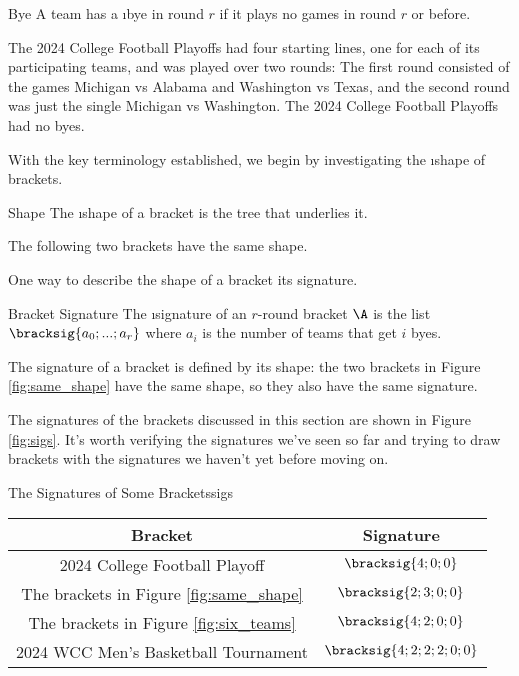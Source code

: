 {\begin{definition}{Bye}{}
    A team has a \i{bye} in round $r$ if it plays no games in round $r$ or before.
\end{definition}

The 2024 College Football Playoffs had four starting lines, one for each of its participating teams, and was played over two rounds: The first round consisted of the games Michigan vs Alabama and Washington vs Texas, and the second round was just the single  Michigan vs Washington. The 2024 College Football Playoffs had no byes.

With the key terminology established, we begin by investigating the \i{shape} of brackets.

\begin{definition}{Shape}{}
    The \i{shape} of a bracket is the tree that underlies it.
\end{definition}

The following two brackets have the same shape.


One way to describe the shape of a bracket its signature.

\begin{definition}{Bracket Signature}{}
    The \i{signature} of an $r$-round bracket $\A$ is the list $\bracksig{a_0; ...; a_r}$ where $a_i$ is the number of teams that get $i$ byes.
\end{definition}

The signature of a bracket is defined by its shape: the two brackets in Figure \ref{fig:same_shape} have the same shape, so they also have the same signature.

The signatures of the brackets discussed in this section are shown in Figure \ref{fig:sigs}. It's worth verifying the signatures we've seen so far and trying to draw brackets with the signatures we haven't yet before moving on.

\begin{figg}{The Signatures of Some Brackets}{sigs}
    \begin{center}
        \begin{tabular}{ c | c }
            Bracket & Signature \\
            \hline
            2024 College Football Playoff & $\bracksig{4; 0; 0}$ \\
            The brackets in Figure \ref{fig:same_shape} & $\bracksig{2; 3; 0; 0}$\\
            The brackets in Figure \ref{fig:six_teams} & $\bracksig{4; 2; 0; 0}$\\
            2024 WCC Men's Basketball Tournament & $\bracksig{4;2;2;2;0;0}$ \\
        \end{tabular}
    \end{center}
\end{figg}

}
